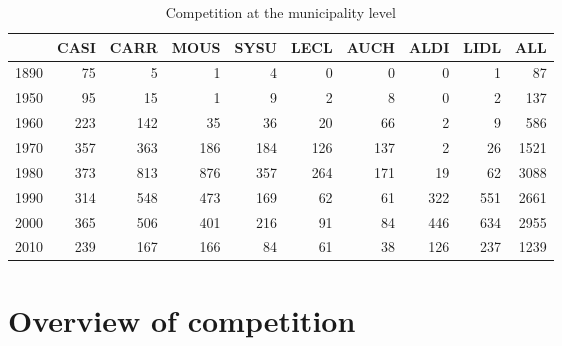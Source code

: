 \documentclass[11pt]{article}
\begin{document}
\begin{table}[H]
\caption{Competition at the municipality level}
\small
\begin{tabular}{lrrrrrrrrr}
\toprule
\toprule
{} &  CASI &  CARR &  MOUS &  SYSU &  LECL &  AUCH &  ALDI &  LIDL &   ALL \\
\midrule
1890    &      75 &          5 &              1 &          4 &        0 &       0 &     0 &     1 &    87 \\
1950    &      95 &         15 &              1 &          9 &        2 &       8 &     0 &     2 &   137 \\
1960    &     223 &        142 &             35 &         36 &       20 &      66 &     2 &     9 &   586 \\
1970    &     357 &        363 &            186 &        184 &      126 &     137 &     2 &    26 &  1521 \\
1980    &     373 &        813 &            876 &        357 &      264 &     171 &    19 &    62 &  3088 \\
1990    &     314 &        548 &            473 &        169 &       62 &      61 &   322 &   551 &  2661 \\
2000    &     365 &        506 &            401 &        216 &       91 &      84 &   446 &   634 &  2955 \\
2010    &     239 &        167 &            166 &         84 &       61 &      38 &   126 &   237 &  1239 \\
\bottomrule
\end{tabular}
\end{table}

\section{Overview of competition}
\end{document}
